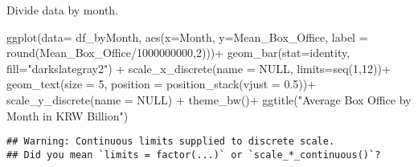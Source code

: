 \documentclass[
]{article}
\newenvironment{Shaded}{\begin{snugshade}}{\end{snugshade}}
\newcommand{\AttributeTok}[1]{\textcolor[rgb]{0.77,0.63,0.00}{#1}}
\newcommand{\ConstantTok}[1]{\textcolor[rgb]{0.00,0.00,0.00}{#1}}
\newcommand{\DecValTok}[1]{\textcolor[rgb]{0.00,0.00,0.81}{#1}}
\newcommand{\FloatTok}[1]{\textcolor[rgb]{0.00,0.00,0.81}{#1}}
\newcommand{\FunctionTok}[1]{\textcolor[rgb]{0.00,0.00,0.00}{#1}}
\newcommand{\NormalTok}[1]{#1}
\newcommand{\OtherTok}[1]{\textcolor[rgb]{0.56,0.35,0.01}{#1}}
\newcommand{\SpecialCharTok}[1]{\textcolor[rgb]{0.00,0.00,0.00}{#1}}
\newcommand{\StringTok}[1]{\textcolor[rgb]{0.31,0.60,0.02}{#1}}
\begin{document}
Divide data by month.

\begin{Shaded}
\end{Shaded}

\begin{Shaded}
\begin{Highlighting}[]
\FunctionTok{ggplot}\NormalTok{(}\AttributeTok{data=}\NormalTok{ df\_byMonth, }\FunctionTok{aes}\NormalTok{(}\AttributeTok{x=}\NormalTok{Month, }\AttributeTok{y=}\NormalTok{Mean\_Box\_Office, }
      \AttributeTok{label =} \FunctionTok{round}\NormalTok{(Mean\_Box\_Office}\SpecialCharTok{/}\DecValTok{1000000000}\NormalTok{,}\DecValTok{2}\NormalTok{)))}\SpecialCharTok{+}
  \FunctionTok{geom\_bar}\NormalTok{(}\AttributeTok{stat=}\StringTok{\textquotesingle{}identity\textquotesingle{}}\NormalTok{, }\AttributeTok{fill=}\StringTok{"darkslategray2"}\NormalTok{) }\SpecialCharTok{+}
  \FunctionTok{scale\_x\_discrete}\NormalTok{(}\AttributeTok{name =} \ConstantTok{NULL}\NormalTok{, }\AttributeTok{limits=}\FunctionTok{seq}\NormalTok{(}\DecValTok{1}\NormalTok{,}\DecValTok{12}\NormalTok{))}\SpecialCharTok{+}
  \FunctionTok{geom\_text}\NormalTok{(}\AttributeTok{size =} \DecValTok{5}\NormalTok{, }\AttributeTok{position =} \FunctionTok{position\_stack}\NormalTok{(}\AttributeTok{vjust =} \FloatTok{0.5}\NormalTok{))}\SpecialCharTok{+}
  \FunctionTok{scale\_y\_discrete}\NormalTok{(}\AttributeTok{name =} \ConstantTok{NULL}\NormalTok{) }\SpecialCharTok{+}
  \FunctionTok{theme\_bw}\NormalTok{()}\SpecialCharTok{+}
  \FunctionTok{ggtitle}\NormalTok{(}\StringTok{"Average Box Office by Month in KRW Billion"}\NormalTok{)}
\end{Highlighting}
\end{Shaded}

\begin{verbatim}
## Warning: Continuous limits supplied to discrete scale.
## Did you mean `limits = factor(...)` or `scale_*_continuous()`?
\end{verbatim}
\end{document}
